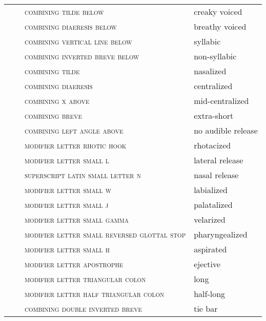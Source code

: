\begin{center}
\begin{xtabular}{ l L{1.1cm} L{6.2cm} L{3.6cm} }
 &  & \textsc{combining tilde below} & creaky voiced \\
 &  & \textsc{combining diaeresis below} & breathy voiced \\
 &  & \textsc{combining vertical line below} & syllabic \\
 &  & \textsc{combining inverted breve below} & non-syllabic \\
 &  & \textsc{combining tilde} & nasalized \\
 &  & \textsc{combining diaeresis} & centralized \\
 &  & \textsc{combining x above} & mid-centralized \\
 &  & \textsc{combining breve} & extra-short \\
 &  & \textsc{combining left angle above} & no audible release \\
 &  & \textsc{modifier letter rhotic hook} & rhotacized \\
 &  & \textsc{modifier letter small l} & lateral release \\
 &  & \textsc{superscript latin small letter n} & nasal release \\
 &  & \textsc{modifier letter small w} & labialized \\
 &  & \textsc{modifier letter small j} & palatalized \\
 &  & \textsc{modifier letter small gamma} & velarized \\
 &  & \textsc{modifier letter small reversed glottal stop} & pharyngealized \\
 &  & \textsc{modifier letter small h} & aspirated \\
 &  & \textsc{modifier letter apostrophe} & ejective \\
 &  & \textsc{modifier letter triangular colon} & long \\
 &  & \textsc{modifier letter half triangular colon} & half-long \\
 &  & \textsc{combining double inverted breve} & tie bar \\
\end{xtabular}
\end{center}